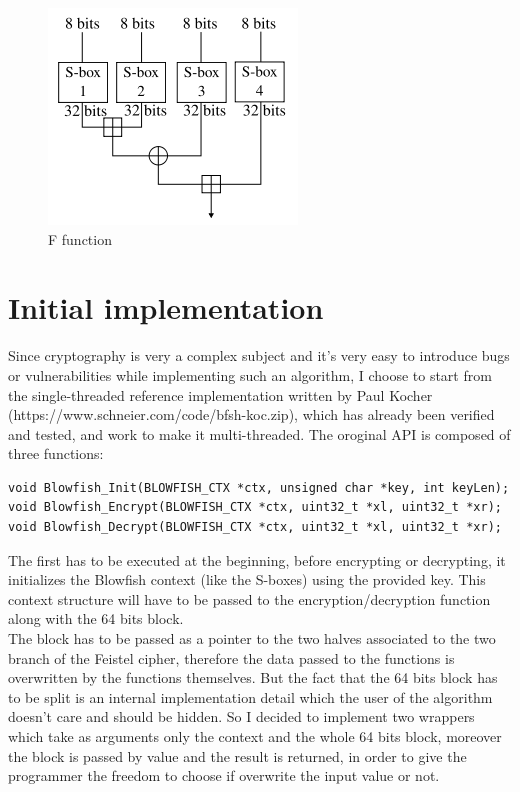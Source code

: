 \begin{figure}[H]
\centering
\includegraphics[scale = 0.6]{./Pictures/Blowfish_F_Function} %
\caption{F function}
\label{fig:F function}
\end{figure}

\section{Initial implementation}
Since cryptography is very a complex subject and it's very easy to introduce bugs or vulnerabilities while implementing such an algorithm, I choose to start from the single-threaded reference implementation written by Paul Kocher (https://www.schneier.com/code/bfsh-koc.zip), which has already been verified and tested, and work to make it multi-threaded.
The oroginal API is composed of three functions:

\begin{center}
\begin{lstlisting}
void Blowfish_Init(BLOWFISH_CTX *ctx, unsigned char *key, int keyLen);
void Blowfish_Encrypt(BLOWFISH_CTX *ctx, uint32_t *xl, uint32_t *xr);
void Blowfish_Decrypt(BLOWFISH_CTX *ctx, uint32_t *xl, uint32_t *xr);
\end{lstlisting}
\end{center}

The first has to be executed at the beginning, before encrypting or decrypting, it initializes the Blowfish context (like the S-boxes) using the provided key. This context structure will have to be passed to the encryption/decryption function along with the 64 bits block.\\
The block has to be passed as a pointer to the two halves associated to the two branch of the Feistel cipher, therefore the data passed to the functions is overwritten by the functions themselves. But the fact that the 64 bits block has to be split is an internal implementation detail which the user of the algorithm doesn't care and should be hidden. So I decided to implement two wrappers which take as arguments only the context and the whole 64 bits block, moreover the block is passed by value and the result is returned, in order to give the programmer the freedom to choose if overwrite the input value or not.

